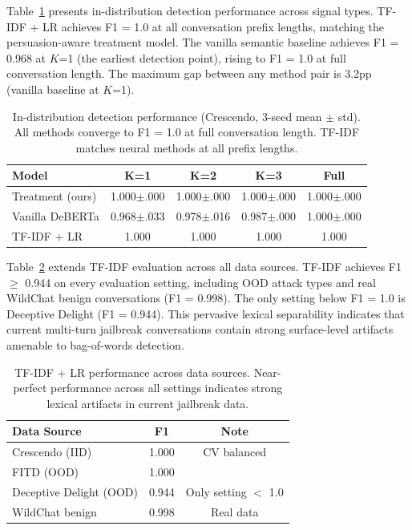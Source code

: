 \documentclass[11pt]{article}
\begin{document}
Table~\ref{tab:iid} presents in-distribution detection performance across signal types. TF-IDF + LR achieves F1 = 1.0 at all conversation prefix lengths, matching the persuasion-aware treatment model. The vanilla semantic baseline achieves F1 = 0.968 at $K$=1 (the earliest detection point), rising to F1 = 1.0 at full conversation length. The maximum gap between any method pair is 3.2pp (vanilla baseline at $K$=1).

\begin{table}[t]
\centering
\caption{In-distribution detection performance (Crescendo, 3-seed mean $\pm$ std). All methods converge to F1 = 1.0 at full conversation length. TF-IDF matches neural methods at all prefix lengths.}
\label{tab:iid}
\begin{tabular}{lcccc}
\toprule
\textbf{Model} & \textbf{K=1} & \textbf{K=2} & \textbf{K=3} & \textbf{Full} \\
\midrule
Treatment (ours) & 1.000{\scriptsize$\pm$.000} & 1.000{\scriptsize$\pm$.000} & 1.000{\scriptsize$\pm$.000} & 1.000{\scriptsize$\pm$.000} \\
Vanilla DeBERTa & 0.968{\scriptsize$\pm$.033} & 0.978{\scriptsize$\pm$.016} & 0.987{\scriptsize$\pm$.000} & 1.000{\scriptsize$\pm$.000} \\
TF-IDF + LR & 1.000 & 1.000 & 1.000 & 1.000 \\
\bottomrule
\end{tabular}
\end{table}

Table~\ref{tab:tfidf} extends TF-IDF evaluation across all data sources. TF-IDF achieves F1 $\geq$ 0.944 on every evaluation setting, including OOD attack types and real WildChat benign conversations (F1 = 0.998). The only setting below F1 = 1.0 is Deceptive Delight (F1 = 0.944). This pervasive lexical separability indicates that current multi-turn jailbreak conversations contain strong surface-level artifacts amenable to bag-of-words detection.

\begin{table}[t]
\centering
\caption{TF-IDF + LR performance across data sources. Near-perfect performance across all settings indicates strong lexical artifacts in current jailbreak data.}
\label{tab:tfidf}
\begin{tabular}{lcc}
\toprule
\textbf{Data Source} & \textbf{F1} & \textbf{Note} \\
\midrule
Crescendo (IID) & 1.000 & CV balanced \\
FITD (OOD) & 1.000 & \\
Deceptive Delight (OOD) & 0.944 & Only setting $<$ 1.0 \\
WildChat benign & 0.998 & Real data \\
\bottomrule
\end{tabular}
\end{table}
\end{document}
